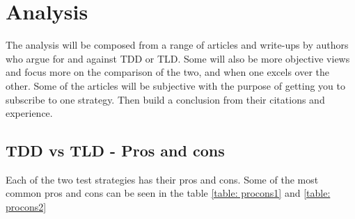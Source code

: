 \section{Analysis}
\label{section:analysis}
The analysis will be composed from a range of articles and write-ups by authors who argue for and against TDD or TLD. 
Some will also be more objective views and focus more on the comparison of the two, and when one excels over the other. 
Some of the articles will be subjective with the purpose of getting you to subscribe to one strategy. 
Then build a conclusion from their citations and experience.   





\subsection{TDD vs TLD - Pros and cons} 

Each of the two test strategies has their pros and cons. Some of the most common pros and cons can be seen 
in the table
\ref{table: procons1} and  \ref{table: procons2}
\begin{center}

\end{center}






